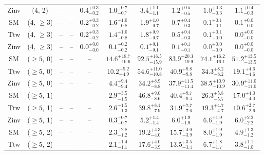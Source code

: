 \begin{table}[h!]
{\begin{tabular}{cccccccccc}
	Zinv & (4, 2) & -- & -- & $0.4^{+ 0.3 }_{- 0.2 }$ & $1.0^{+ 0.7 }_{- 0.7 }$ & $3.4^{+ 1.1 }_{- 1.1 }$ & $1.2^{+ 0.5 }_{- 0.5 }$ & $1.0^{+ 0.3 }_{- 0.3 }$ & $1.1^{+ 0.4 }_{- 0.3 }$ \\[0.5ex] 
	SM & (4, $\ge3$) & -- & -- & $0.2^{+ 0.3 }_{- 0.2 }$ & $1.6^{+ 1.0 }_{- 0.8 }$ & $1.9^{+ 1.0 }_{- 0.7 }$ & $0.7^{+ 0.4 }_{- 0.3 }$ & $0.1^{+ 0.1 }_{- 0.1 }$ & $0.1^{+ 0.0 }_{- 0.0 }$ \\[0.5ex] 
	Ttw & (4, $\ge3$) & -- & -- & $0.2^{+ 0.3 }_{- 0.2 }$ & $1.4^{+ 1.0 }_{- 0.8 }$ & $1.8^{+ 0.9 }_{- 0.7 }$ & $0.5^{+ 0.4 }_{- 0.3 }$ & $0.1^{+ 0.1 }_{- 0.0 }$ & $0.0^{+ 0.0 }_{- 0.0 }$ \\[0.5ex] 
	Zinv & (4, $\ge3$) & -- & -- & $0.0^{+ 0.0 }_{- 0.0 }$ & $0.1^{+ 0.2 }_{- 0.2 }$ & $0.1^{+ 0.1 }_{- 0.1 }$ & $0.1^{+ 0.1 }_{- 0.1 }$ & $0.0^{+ 0.0 }_{- 0.0 }$ & $0.0^{+ 0.0 }_{- 0.0 }$ \\[0.5ex] 
	SM & ($\ge5$, 0) & -- & -- & -- & $14.6^{+ 18.7 }_{- 10.6 }$ & $92.5^{+ 16.5 }_{- 15.9 }$ & $83.9^{+ 20.3 }_{- 19.9 }$ & $74.1^{+ 16.2 }_{- 16.1 }$ & $51.2^{+ 13.5 }_{- 13.5 }$ \\[0.5ex] 
	Ttw & ($\ge5$, 0) & -- & -- & -- & $10.2^{+ 5.2 }_{- 4.9 }$ & $54.6^{+ 11.0 }_{- 10.8 }$ & $40.9^{+ 9.8 }_{- 9.8 }$ & $34.3^{+ 8.2 }_{- 8.2 }$ & $19.1^{+ 4.6 }_{- 4.6 }$ \\[0.5ex] 
	Zinv & ($\ge5$, 0) & -- & -- & -- & $4.4^{+ 9.4 }_{- 9.4 }$ & $34.2^{+ 8.9 }_{- 8.8 }$ & $37.9^{+ 11.5 }_{- 11.4 }$ & $38.5^{+ 10.9 }_{- 10.9 }$ & $30.9^{+ 11.0 }_{- 11.0 }$ \\[0.5ex] 
	SM & ($\ge5$, 1) & -- & -- & -- & $2.9^{+ 3.5 }_{- 1.5 }$ & $46.8^{+ 9.0 }_{- 8.6 }$ & $40.4^{+ 9.7 }_{- 9.4 }$ & $26.3^{+ 5.8 }_{- 5.7 }$ & $17.0^{+ 4.0 }_{- 4.0 }$ \\[0.5ex] 
	Ttw & ($\ge5$, 1) & -- & -- & -- & $2.6^{+ 1.5 }_{- 1.3 }$ & $39.8^{+ 8.1 }_{- 7.9 }$ & $31.9^{+ 7.7 }_{- 7.6 }$ & $19.3^{+ 4.7 }_{- 4.7 }$ & $10.6^{+ 2.7 }_{- 2.6 }$ \\[0.5ex] 
	Zinv & ($\ge5$, 1) & -- & -- & -- & $0.3^{+ 0.7 }_{- 0.7 }$ & $5.2^{+ 1.4 }_{- 1.4 }$ & $6.0^{+ 1.9 }_{- 1.9 }$ & $6.6^{+ 1.9 }_{- 1.9 }$ & $6.0^{+ 2.2 }_{- 2.2 }$ \\[0.5ex] 
	SM & ($\ge5$, 2) & -- & -- & -- & $2.3^{+ 2.8 }_{- 1.2 }$ & $19.2^{+ 4.3 }_{- 4.0 }$ & $15.7^{+ 4.0 }_{- 3.9 }$ & $8.0^{+ 1.9 }_{- 1.9 }$ & $4.9^{+ 1.3 }_{- 1.2 }$ \\[0.5ex] 
	Ttw & ($\ge5$, 2) & -- & -- & -- & $2.1^{+ 1.4 }_{- 1.1 }$ & $17.6^{+ 4.0 }_{- 3.9 }$ & $13.5^{+ 3.5 }_{- 3.4 }$ & $6.7^{+ 1.8 }_{- 1.7 }$ & $3.8^{+ 1.1 }_{- 1.0 }$ \\[0.5ex] 

\end{tabular}}
\end{table}
